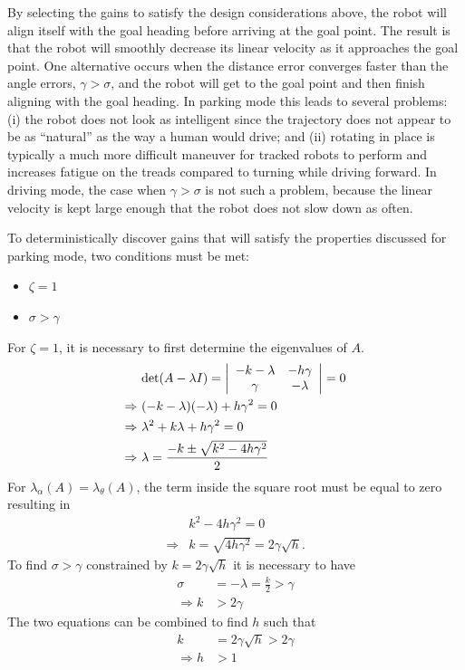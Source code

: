 By selecting the gains to satisfy the design considerations above, the robot will align itself with the goal heading before arriving at the goal point.
The result is that the robot will smoothly decrease its linear velocity as it approaches the goal point.
One alternative occurs when the distance error converges faster than the angle errors, $\gamma>\sigma$, and the robot will get to the goal point and then finish aligning with the goal heading.
In parking mode this leads to several problems: (i) the robot does not look as intelligent since the trajectory does not appear to be as ``natural'' as the way a human would drive; and (ii) rotating in place is typically a much more difficult maneuver for tracked robots to perform and increases fatigue on the treads compared to turning while driving forward.
In driving mode, the case when $\gamma>\sigma$ is not such a problem, because the linear velocity is kept large enough that the robot does not slow down as often.

To deterministically discover gains that will satisfy the properties discussed for parking mode, two conditions must be met:
\begin{itemize}
\item $\zeta = 1$
\item $\sigma > \gamma$
\end{itemize}
For $\zeta=1$, it is necessary to first determine the eigenvalues of $A$.
\begin{align*}
&\text{det}(A-\lambda I) = \left|\begin{array}{c c} -k-\lambda & -h\gamma \\ \gamma & -\lambda\end{array}\right| = 0 \\
\Rightarrow~& (-k-\lambda) (-\lambda)+h\gamma^2 = 0 \\
\Rightarrow~&\lambda^2 + k\lambda+h\gamma^2 = 0 \\
\Rightarrow~&\lambda= \frac{-k\pm\sqrt{k^2-4h\gamma^2}}{2}%
\end{align*}
For $\lambda_\alpha(A)=\lambda_\theta(A)$, the term inside the square root must be equal to zero resulting in
\begin{align*}
&k^2 - 4h\gamma^2 = 0 \\
\Rightarrow &k = \sqrt{4h\gamma^2} = 2\gamma\sqrt{h}.
\end{align*}
To find $\sigma>\gamma$ constrained by $k=2\gamma\sqrt{h}$ it is necessary to have
\begin{align*}
\sigma &= -\lambda = \tfrac{k}{2} > \gamma \\
\Rightarrow k &> 2\gamma
\end{align*}
The two equations can be combined to find $h$ such that
\begin{align*}
k &= 2\gamma\sqrt{h} > 2\gamma \\
\Rightarrow h &> 1
\end{align*}

